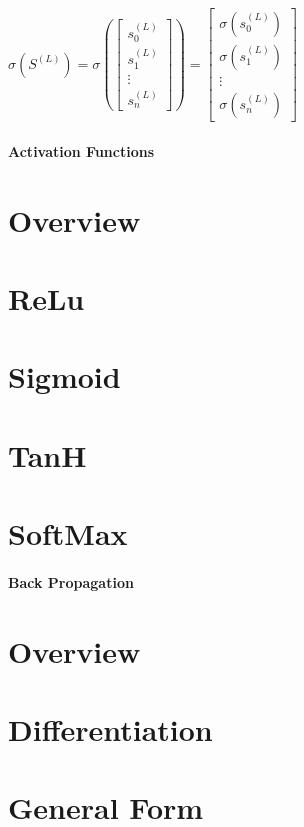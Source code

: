 \begin{flushleft}
\begin{center}
                        $
                        \sigma(S^{(L)})
                        =
                        \sigma\left(
                        \begin{bmatrix}
                        s^{(L)}_{0} \\
                        s^{(L)}_{1} \\
                        \vdots      \\
                        s^{(L)}_{n} 
                        \end{bmatrix}
                        \right)
                        =
                        \begin{bmatrix}
                        \sigma(s^{(L)}_{0}) \\
                        \sigma(s^{(L)}_{1}) \\
                        \vdots              \\
                        \sigma(s^{(L)}_{n}) 
                        \end{bmatrix}
                        $ 
                    \end{center}
            \subsubsection{Activation Functions}
                \chapter{Overview}
                \chapter{ReLu}
                \chapter{Sigmoid}
                \chapter{TanH}
                \chapter{SoftMax}
            \subsubsection{Back Propagation}
                \chapter{Overview}
                \chapter{Differentiation}
                \chapter{General Form}

\end{flushleft}